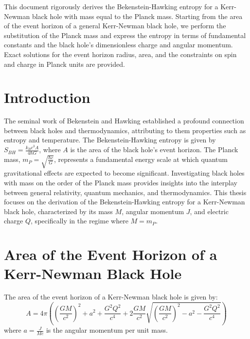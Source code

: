 











	
	
		This document rigorously derives the Bekenstein-Hawking entropy for a Kerr-Newman black hole with mass equal to the Planck mass. Starting from the area of the event horizon of a general Kerr-Newman black hole, we perform the substitution of the Planck mass and express the entropy in terms of fundamental constants and the black hole's dimensionless charge and angular momentum. Exact solutions for the event horizon radius, area, and the constraints on spin and charge in Planck units are provided.

	
	\section{Introduction}
	
	The seminal work of Bekenstein and Hawking established a profound connection between black holes and thermodynamics, attributing to them properties such as entropy and temperature. The Bekenstein-Hawking entropy is given by $S_{BH} = \frac{k_B c^3 A}{4 \hbar G}$, where $A$ is the area of the black hole's event horizon. The Planck mass, $m_P = \sqrt{\frac{\hbar c}{G}}$, represents a fundamental energy scale at which quantum gravitational effects are expected to become significant. Investigating black holes with mass on the order of the Planck mass provides insights into the interplay between general relativity, quantum mechanics, and thermodynamics. This thesis focuses on the derivation of the Bekenstein-Hawking entropy for a Kerr-Newman black hole, characterized by its mass $M$, angular momentum $J$, and electric charge $Q$, specifically in the regime where $M = m_P$.
	
	\section{Area of the Event Horizon of a Kerr-Newman Black Hole}
	
	The area of the event horizon of a Kerr-Newman black hole is given by:
	$$A = 4 \pi \left( \left(\frac{G M}{c^2}\right)^2 + a^2 + \frac{G^2 Q^2}{c^4} + 2 \frac{G M}{c^2} \sqrt{\left(\frac{G M}{c^2}\right)^2 - a^2 - \frac{G^2 Q^2}{c^4}} \right)$$
	where $a = \frac{J}{M c}$ is the angular momentum per unit mass.
	
